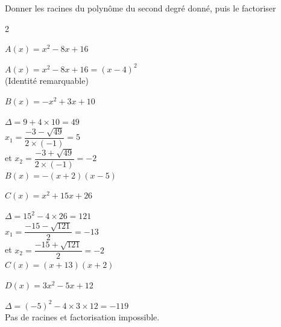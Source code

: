 \documentclass[12pt,a4paper]{article}  %
\begin{document}
\vspace{-0.3cm}

Donner les racines du polynôme du second degré donné, puis le factoriser
\begin{multicols}{2}
\begin{enumMet}
    \item {} $A(x)=x^{2}-8 x+16$\\
    \begin{corrBox}
        $A(x)=x^{2}-8x+16=(x-4)^2$\\
        (Identité remarquable)
    \end{corrBox}
    \item $B(x)=-x^{2}+3 x+10$\\
    \begin{corrBox}
        $\Delta=9+4\times10=49$\\
        $x_1=\dfrac{-3-\sqrt{49}}{2\times(-1)}=5$\\
        et $x_2=\dfrac{-3+\sqrt{49}}{2\times(-1)}=-2$\\
        $B(x)=-(x+2)(x-5)$
    \end{corrBox}
    
    \columnbreak
    \item $C(x)=x^{2}+15x+26$\\
    \begin{corrBox}
        $\Delta=15^2-4\times26=121$\\
        $x_1=\dfrac{-15-\sqrt{121}}{2}=-13$\\
        et $x_2=\dfrac{-15+\sqrt{121}}{2}=-2$\\
        $C(x)=(x+13)(x+2)$
    \end{corrBox}
    \item $D(x)=3 x^{2}-5 x+12$\\
    \begin{corrBox}
        $\Delta=(-5)^2-4\times3\times12=-119$\\
        Pas de racines et factorisation impossible.
    \end{corrBox}
\end{enumMet}
\end{multicols}

\newpage
\vspace{-0.3cm}
\end{document}

